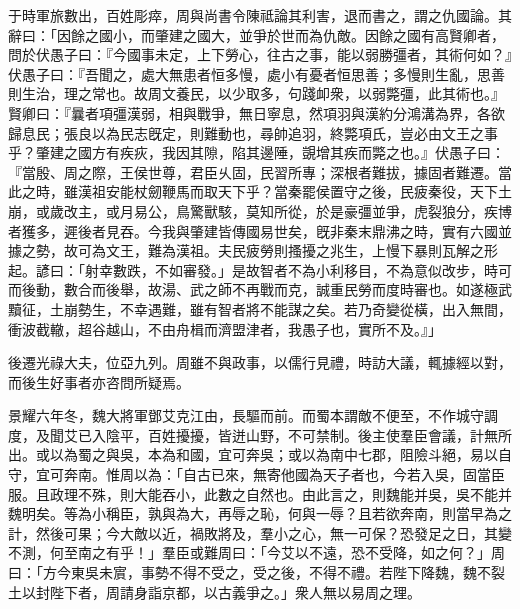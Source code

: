 \begin{pinyinscope}
于時軍旅數出，百姓彫瘁，周與尚書令陳祗論其利害，退而書之，謂之仇國論。其辭曰：「因餘之國小，而肇建之國大，並爭於世而為仇敵。因餘之國有高賢卿者，問於伏愚子曰：『今國事未定，上下勞心，往古之事，能以弱勝彊者，其術何如？』伏愚子曰：『吾聞之，處大無患者恒多慢，處小有憂者恒思善；多慢則生亂，思善則生治，理之常也。故周文養民，以少取多，句踐卹衆，以弱斃彊，此其術也。』賢卿曰：『曩者項彊漢弱，相與戰爭，無日寧息，然項羽與漢約分鴻溝為界，各欲歸息民；張良以為民志旣定，則難動也，尋帥追羽，終斃項氏，豈必由文王之事乎？肇建之國方有疾疢，我因其隙，陷其邊陲，覬增其疾而斃之也。』伏愚子曰：『當殷、周之際，王侯世尊，君臣乆固，民習所專；深根者難拔，據固者難遷。當此之時，雖漢祖安能杖劒鞭馬而取天下乎？當秦罷侯置守之後，民疲秦役，天下土崩，或歲改主，或月易公，鳥驚獸駭，莫知所從，於是豪彊並爭，虎裂狼分，疾博者獲多，遲後者見吞。今我與肇建皆傳國易世矣，旣非秦末鼎沸之時，實有六國並據之勢，故可為文王，難為漢祖。夫民疲勞則搔擾之兆生，上慢下暴則瓦解之形起。諺曰：「射幸數跌，不如審發。」是故智者不為小利移目，不為意似改步，時可而後動，數合而後舉，故湯、武之師不再戰而克，誠重民勞而度時審也。如遂極武黷征，土崩勢生，不幸遇難，雖有智者將不能謀之矣。若乃奇變從橫，出入無間，衝波截轍，超谷越山，不由舟楫而濟盟津者，我愚子也，實所不及。』」

後遷光祿大夫，位亞九列。周雖不與政事，以儒行見禮，時訪大議，輒據經以對，而後生好事者亦咨問所疑焉。

景耀六年冬，魏大將軍鄧艾克江由，長驅而前。而蜀本謂敵不便至，不作城守調度，及聞艾已入陰平，百姓擾擾，皆迸山野，不可禁制。後主使羣臣會議，計無所出。或以為蜀之與吳，本為和國，宜可奔吳；或以為南中七郡，阻險斗絕，易以自守，宜可奔南。惟周以為：「自古已來，無寄他國為天子者也，今若入吳，固當臣服。且政理不殊，則大能吞小，此數之自然也。由此言之，則魏能并吳，吳不能并魏明矣。等為小稱臣，孰與為大，再辱之恥，何與一辱？且若欲奔南，則當早為之計，然後可果；今大敵以近，禍敗將及，羣小之心，無一可保？恐發足之日，其變不測，何至南之有乎！」羣臣或難周曰：「今艾以不遠，恐不受降，如之何？」周曰：「方今東吳未賔，事勢不得不受之，受之後，不得不禮。若陛下降魏，魏不裂土以封陛下者，周請身詣京都，以古義爭之。」衆人無以易周之理。


\end{pinyinscope}
